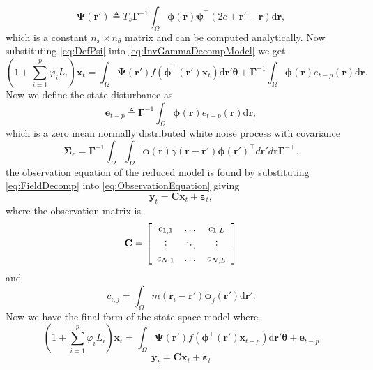 \documentclass[a4paper,10pt]{article}
\begin{document}
\begin{equation}\label{eq:DefPsi}
	\boldsymbol{\Psi}(\mathbf{r}') \triangleq T_s\boldsymbol{\Gamma}^{-1}\int_\Omega {\boldsymbol{\phi}(\mathbf{r})\boldsymbol{\psi}^{\top} (2c+\mathbf{r}'-\mathbf{r})\textrm{d}\mathbf{r}},
\end{equation}
which is a constant $n_x \times n_{\theta}$ matrix and can be computed analytically. Now substituting \eqref{eq:DefPsi} into \eqref{eq:InvGammaDecompModel} we get
\begin{equation}
(1+\sum_{i=1}^{p}\varphi_i L_i) \mathbf{x}_t = \int_\Omega \boldsymbol{\Psi}(\mathbf{r}') f(\boldsymbol{\phi}^{\top}(\mathbf{r}')\mathbf{x}_t) \textrm{d}\mathbf{r}' \boldsymbol{\theta}
+ \boldsymbol{\Gamma}^{-1} \int_\Omega{\boldsymbol{\phi}(\mathbf{r})e_{t-p}(\mathbf{r})\textrm{d}\mathbf{r}}.
\end{equation}
Now we define the state disturbance as
\begin{equation}\label{eq:Wt} 
	\mathbf{e}_{t-p} \triangleq \boldsymbol{\Gamma}^{-1}\int_\Omega {\boldsymbol{\phi} ( \mathbf{r} )e_{t-p}( \mathbf{r} )\textrm{d}\mathbf{r}},
\end{equation}
which is a zero mean normally distributed white noise process with covariance
\begin{equation}
	\boldsymbol\Sigma_e =\mathbf{\Gamma}^{-1}\int_{\Omega}\int_{\Omega}\boldsymbol{\phi}\left(\mathbf r\right) \gamma\left(\mathbf r- \mathbf r' \right)\boldsymbol{\phi}\left(\mathbf r'\right)^{\top}d\mathbf r' d\mathbf r\mathbf{\Gamma}^{- \top}. 
\end{equation}
the observation equation of the reduced model is found by substituting \eqref{eq:FieldDecomp} into \eqref{eq:ObservationEquation} giving
\begin{equation}\label{ObservationEquation} 
	\mathbf{y}_t = \mathbf{C}\mathbf{x}_t + \boldsymbol{\varepsilon}_t,
\end{equation}
where the observation matrix is 
\begin{equation}
	\mathbf{C} = \left[
	\begin{array}{{ccc}} 
		c_{1,1} & \dots & c_{1,L} \\
		\vdots & \ddots & \vdots \\
		c_{N,1} & \dots & c_{N,L} 
	\end{array}
	\right] 
\end{equation}
and 
\begin{equation}
	c_{i,j} = \int_{\Omega}m(\mathbf{r}_i - \mathbf{r}')\boldsymbol{\phi}_j(\mathbf{r}')\textrm{d}\mathbf{r}'. 
\end{equation}
Now we have the final form of the state-space model where
\begin{equation}\label{eq:finalformstatespacemodel}
	(1+\sum_{i=1}^{p}\varphi_i L_i) \mathbf{x}_t = \int_\Omega \boldsymbol{\Psi}(\mathbf{r}') f(\boldsymbol{\phi}^{\top}(\mathbf{r}')\mathbf{x}_{t-p}) \textrm{d}\mathbf{r}' \boldsymbol{\theta}
 +\mathbf{e}_{t-p}
\end{equation}
\begin{equation} 
	\mathbf{y}_t = \mathbf{C}\mathbf{x}_t + \boldsymbol{\varepsilon}_t
\end{equation}
\end{document}
